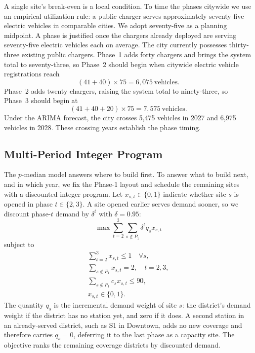 \documentclass[11pt]{article}
\begin{document}
A single site's break-even is a local condition. To time the phases citywide we use an empirical utilization rule: a public charger serves approximately seventy-five electric vehicles in comparable cities. We adopt seventy-five as a planning midpoint. A phase is justified once the chargers already deployed are serving seventy-five electric vehicles each on average. The city currently possesses thirty-three existing public chargers. Phase~1 adds forty chargers and brings the system total to seventy-three, so Phase~2 should begin when citywide electric vehicle registrations reach
\[
(41 + 40) \times 75 = 6{,}075\ \text{vehicles}.
\]
Phase~2 adds twenty chargers, raising the system total to ninety-three, so Phase~3 should begin at
\[
(41 + 40 + 20) \times 75 = 7{,}575\ \text{vehicles}.
\]
Under the ARIMA forecast, the city crosses 5{,}475 vehicles in 2027 and 6{,}975 vehicles in 2028. These crossing years establish the phase timing.

\subsection{Multi-Period Integer Program}

The $p$-median model answers where to build first. To answer what to build next, and in which year, we fix the Phase-1 layout and schedule the remaining sites with a discounted integer program. Let $x_{s,t} \in \{0,1\}$ indicate whether site $s$ is opened in phase $t \in \{2,3\}$. A site opened earlier serves demand sooner, so we discount phase-$t$ demand by $\delta^t$ with $\delta = 0.95$:
\begin{equation}
\max \sum_{t=2}^{3} \sum_{s \notin P_1} \delta^t q_s x_{s,t}
\end{equation}
subject to
\begin{gather}
\sum_{t=2}^{3} x_{s,t} \le 1 \quad \forall s, \\
\sum_{s \notin P_1} x_{s,t} = 2, \quad t = 2,3, \\
\sum_{s \notin P_1} c_s x_{s,t} \le 90, \\
x_{s,t} \in \{0,1\}.
\end{gather}
The quantity $q_s$ is the incremental demand weight of site $s$: the district's demand weight if the district has no station yet, and zero if it does. A second station in an already-served district, such as S1 in Downtown, adds no new coverage and therefore carries $q_s = 0$, deferring it to the last phase as a capacity site. The objective ranks the remaining coverage districts by discounted demand.
\end{document}
